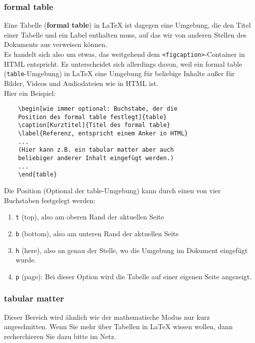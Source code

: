 \subsubsection{formal table}

Eine Tabelle (\textbf{formal table}) in LaTeX ist dagegen eine Umgebung, die den Titel einer Tabelle und ein Label enthalten muss, auf das wir von anderen Stellen des Dokuments aus verweisen können.\\

Es handelt sich also um etwas, das weitgehend dem \verb|<figcaption>|-Container in HTML entspricht. Es unterscheidet sich allerdings davon, weil ein formal table (\verb|table|-Umgebung) in LaTeX eine Umgebung für beliebige Inhalte außer für Bilder, Videos und Audiodateien wie in HTML ist.\\

Hier ein Beispiel:

\begin{verbatim}
	\begin[wie immer optional: Buchstabe, der die 
	Position des formal table festlegt]{table}
	\caption[Kurztitel]{Titel des formal table}
	\label{Referenz, entspricht einem Anker in HTML}
	...
	(Hier kann z.B. ein tabular matter aber auch 
	beliebiger anderer Inhalt eingefügt werden.)
	...
	\end{table}
\end{verbatim}

Die Position (Optional der table-Umgebung) kann durch einen von vier Buchstaben festgelegt werden:

\begin{enumerate}
	\item \verb|t| (top), also am oberen Rand der aktuellen Seite
	\item \verb|b| (bottom), also am unteren Rand der aktuellen Seite
	\item \verb|h| (here), also an genau der Stelle, wo die Umgebung im Dokument eingefügt wurde.
	\item \verb|p| (page): Bei dieser Option wird die Tabelle auf einer eigenen Seite angezeigt.
\end{enumerate}

\subsubsection{tabular matter}

Dieser Bereich wird ähnlich wie der mathematische Modus nur kurz angeschnitten. Wenn Sie mehr über Tabellen in LaTeX wissen wollen, dann recherchieren Sie dazu bitte im Netz.\\

